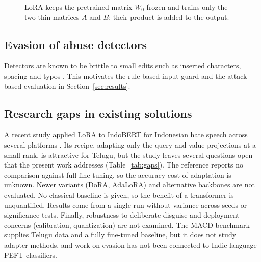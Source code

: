 \documentclass[conference]{IEEEtran}
\begin{document}
\begin{figure}[t]
\centering
{}
\caption{LoRA keeps the pretrained matrix $W_0$ frozen and trains only the two thin matrices $A$ and $B$; their product is added to the output.}
\label{fig:lora}
\end{figure}

\subsection{Evasion of abuse detectors}
Detectors are known to be brittle to small edits such as inserted characters, spacing and typos \cite{hosseini2017,grondahl2018}. This motivates the rule-based input guard and the attack-based evaluation in Section~\ref{sec:results}.

\subsection{Research gaps in existing solutions}
A recent study applied LoRA to IndoBERT for Indonesian hate speech across several platforms \cite{kaunang2026indo}. Its recipe, adapting only the query and value projections at a small rank, is attractive for Telugu, but the study leaves several questions open that the present work addresses (Table~\ref{tab:gaps}). The reference reports no comparison against full fine-tuning, so the accuracy cost of adaptation is unknown. Newer variants (DoRA, AdaLoRA) and alternative backbones are not evaluated. No classical baseline is given, so the benefit of a transformer is unquantified. Results come from a single run without variance across seeds or significance tests. Finally, robustness to deliberate disguise and deployment concerns (calibration, quantization) are not examined. The MACD benchmark \cite{gupta2022macd} supplies Telugu data and a fully fine-tuned baseline, but it does not study adapter methods, and work on evasion \cite{hosseini2017,grondahl2018} has not been connected to Indic-language PEFT classifiers.
\end{document}
